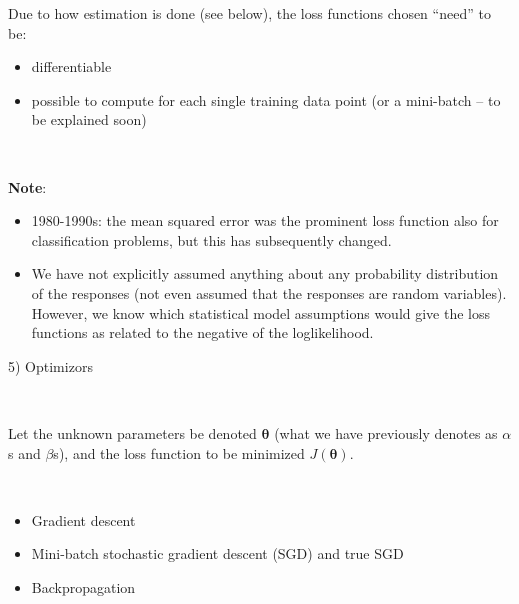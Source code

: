 \documentclass[10pt,ignorenonframetext,]{beamer}
\providecommand{\tightlist}{%
  \setlength{\itemsep}{0pt}\setlength{\parskip}{0pt}}
\begin{document}
\begin{frame}

Due to how estimation is done (see below), the loss functions chosen
``need'' to be:

\begin{itemize}
\tightlist
\item
  differentiable
\item
  possible to compute for each single training data point (or a
  mini-batch -- to be explained soon)
\end{itemize}

\(~\)

\textbf{Note}:

\begin{itemize}
\item
  1980-1990s: the mean squared error was the prominent loss function
  also for classification problems, but this has subsequently changed.
\item
  We have not explicitly assumed anything about any probability
  distribution of the responses (not even assumed that the responses are
  random variables). However, we know which statistical model
  assumptions would give the loss functions as related to the negative
  of the loglikelihood.
\end{itemize}

\end{frame}

\begin{frame}

\begin{block}{5) Optimizors}

\(~\)

Let the unknown parameters be denoted \({\boldsymbol \theta}\) (what we
have previously denotes as \(\alpha\)s and \(\beta\)s), and the loss
function to be minimized \(J({\boldsymbol \theta})\).

\(~\)

\begin{itemize}
\item
  Gradient descent
\item
  Mini-batch stochastic gradient descent (SGD) and true SGD
\item
  Backpropagation
\end{itemize}

\end{block}

\end{frame}
\end{document}
